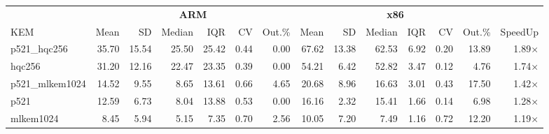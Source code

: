 \begin{table}[!ht]
\centering
\begin{tabular}{l|rrrrrr|rrrrrr|r}
\toprule
& \multicolumn{6}{c}{\bfseries ARM} & \multicolumn{6}{c}{\bfseries x86} & \\
\cmidrule(lr){2-7} \cmidrule(lr){8-13}
KEM & Mean & SD & Median & IQR & CV & Out.\% & Mean & SD & Median & IQR & CV & Out.\% & SpeedUp \\
\midrule
p521_hqc256 & 35.70 & 15.54 & 25.50 & 25.42 & 0.44 & 0.00 & 67.62 & 13.38 & 62.53 & 6.92 & 0.20 & 13.89 & 1.89× \\
hqc256 & 31.20 & 12.16 & 22.47 & 23.35 & 0.39 & 0.00 & 54.21 & 6.42 & 52.82 & 3.47 & 0.12 & 4.76 & 1.74× \\
p521_mlkem1024 & 14.52 & 9.55 & 8.65 & 13.61 & 0.66 & 4.65 & 20.68 & 8.96 & 16.63 & 3.01 & 0.43 & 17.50 & 1.42× \\
p521 & 12.59 & 6.73 & 8.04 & 13.88 & 0.53 & 0.00 & 16.16 & 2.32 & 15.41 & 1.66 & 0.14 & 6.98 & 1.28× \\
mlkem1024 & 8.45 & 5.94 & 5.15 & 7.35 & 0.70 & 2.56 & 10.05 & 7.20 & 7.49 & 1.16 & 0.72 & 12.20 & 1.19× \\
\bottomrule
\end{tabular}
\end{table}
